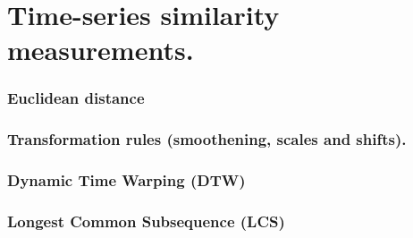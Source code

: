 \chapter{Time-series similarity measurements.}

\subsection{Euclidean distance}



\subsection{Transformation rules (smoothening, scales and shifts).}

\subsection{Dynamic Time Warping (DTW)}

\subsection{Longest Common Subsequence (LCS) }